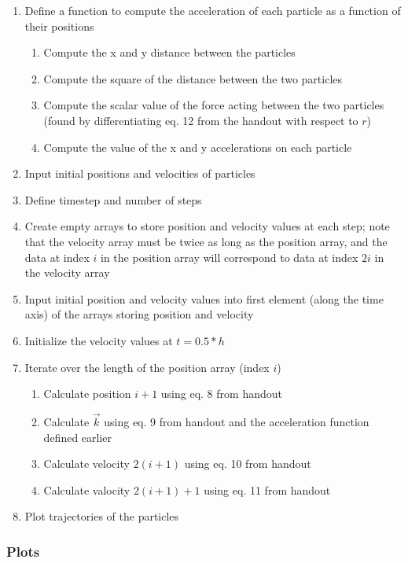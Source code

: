 \documentclass{article}
\begin{document}
\begin{enumerate}
	\item Define a function to compute the acceleration of each particle as a function of their positions
	\begin{enumerate}[label*=\arabic*]
		\item Compute the x and y distance between the particles
		\item Compute the square of the distance between the two particles
		\item Compute the scalar value of the force acting between the two particles (found by differentiating eq. 12 from the handout with respect to $r$)
		\item Compute the value of the x and y accelerations on each particle
	\end{enumerate}
	\item Input initial positions and velocities of particles
	\item Define timestep and number of steps
	\item Create empty arrays to store position and velocity values at each step; note that the velocity array must be twice as long as the position array, and the data at index $i$ in the position array will correspond to data at index $2i$ in the velocity array
	\item Input initial position and velocity values into first element (along the time axis) of the arrays storing position and velocity
	\item Initialize the velocity values at $t=0.5*h$
	\item Iterate over the length of the position array (index $i$)
	\begin{enumerate}[label*=\arabic*]
		\item Calculate position $i+1$ using eq. 8 from handout
		\item Calculate $\vec{k}$ using eq. 9 from handout and the acceleration function defined earlier
		\item Calculate velocity $2(i+1)$ using eq. 10 from handout
		\item Calculate valocity $2(i+1)+1$ using eq. 11 from handout
	\end{enumerate}
	\item Plot trajectories of the particles
\end{enumerate}

\subsubsection{Plots}
\end{document}
